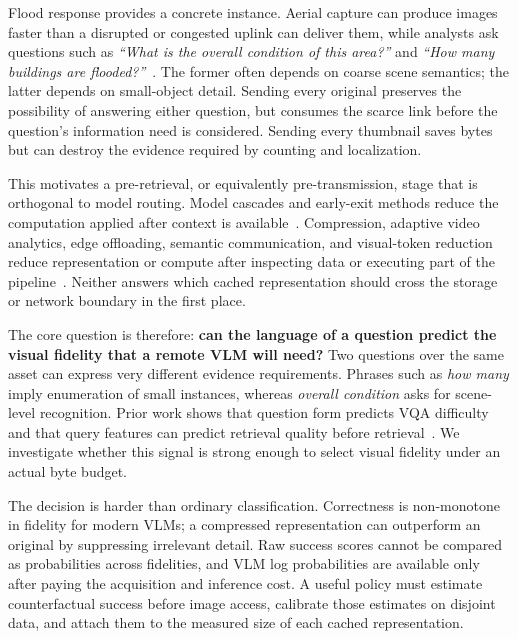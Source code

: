\documentclass[10pt,conference]{IEEEtran}
\begin{document}
Flood response provides a concrete instance. Aerial capture can produce images
faster than a disrupted or congested uplink can deliver them, while analysts
ask questions such as \emph{``What is the overall condition of this area?''}
and \emph{``How many buildings are flooded?''}~\cite{rahnemoonfar2021floodnet}.
The former often depends on coarse scene semantics; the latter depends on
small-object detail. Sending every original preserves the possibility of
answering either question, but consumes the scarce link before the question's
information need is considered. Sending every thumbnail saves bytes but can
destroy the evidence required by counting and localization.

This motivates a pre-retrieval, or equivalently pre-transmission, stage that is
orthogonal to model routing. Model cascades and early-exit methods reduce the
computation applied after context is available~\cite{chen2023frugalgpt,
ding2024hybrid,wang2024routellm,zhou2020bert,schuster2022confident}.
Compression, adaptive video analytics, edge offloading, semantic
communication, and visual-token reduction reduce representation or compute
after inspecting data or executing part of the pipeline~\cite{
toderici2016variablerateimagecompression,weng2024learning,
jiang2018chameleon,du2020dds,li2020reducto,kang2017neurosurgeon,
xie2021semantic,cai2024matryoshka,chen2024fastv}. Neither
answers which cached representation should cross the storage or network
boundary in the first place.

The core question is therefore: \textbf{can the language of a question predict
the visual fidelity that a remote VLM will need?} Two questions over the same
asset can express very different evidence requirements. Phrases such as
\emph{how many} imply enumeration of small instances, whereas \emph{overall
condition} asks for scene-level recognition. Prior work shows that question
form predicts VQA difficulty~\cite{kafle2017analysis,agrawal2018dont} and that
query features can predict retrieval quality before retrieval~\cite{
zhao2008predicting,hauff2008improved,mothe2005linguistic}. We investigate
whether this signal is strong enough to select visual fidelity under an actual
byte budget.

The decision is harder than ordinary classification. Correctness is
non-monotone in fidelity for modern VLMs; a compressed representation can
outperform an original by suppressing irrelevant detail. Raw success scores
cannot be compared as probabilities across fidelities, and VLM log
probabilities are available only after paying the acquisition and inference
cost. A useful policy must estimate counterfactual success before image access,
calibrate those estimates on disjoint data, and attach them to the measured
size of each cached representation.
\end{document}
